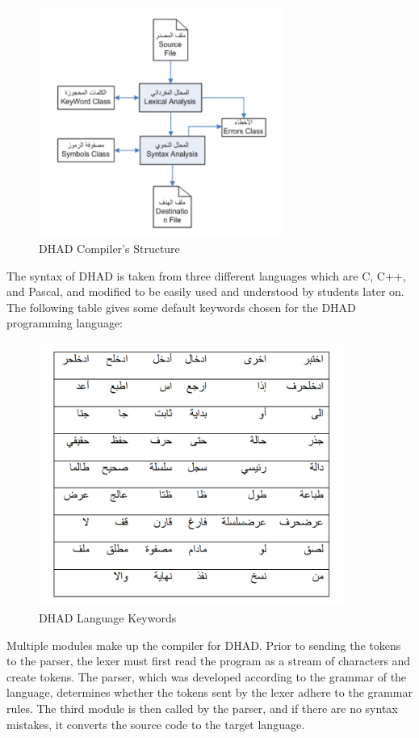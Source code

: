 \begin{figure}[H]
\centering
\includegraphics[width=8cm]{ch2-images/DHAD2.png}
\caption{DHAD Compiler's Structure \cite{othman2016arabic}}
\label{fig:DHAD Compiler's Structure}
\end{figure}

The syntax of DHAD is taken from three different languages which are C, C++, and Pascal, and modified to be easily used and understood by students later on. The following table gives some default keywords chosen for the DHAD programming language:

\begin{figure}[ht]
\centering
\includegraphics[width=10cm]{ch2-images/DHAD3.png}
\caption{DHAD Language Keywords \cite{othman2016arabic}}
\label{fig:DHAD Language Keywords}
\end{figure}

Multiple modules make up the compiler for DHAD. Prior to sending the tokens to the parser, the lexer must first read the program as a stream of characters and create tokens. The parser, which was developed according to the grammar of the language, determines whether the tokens sent by the lexer adhere to the grammar rules. The third module is then called by the parser, and if there are no syntax mistakes, it converts the source code to the target language.

